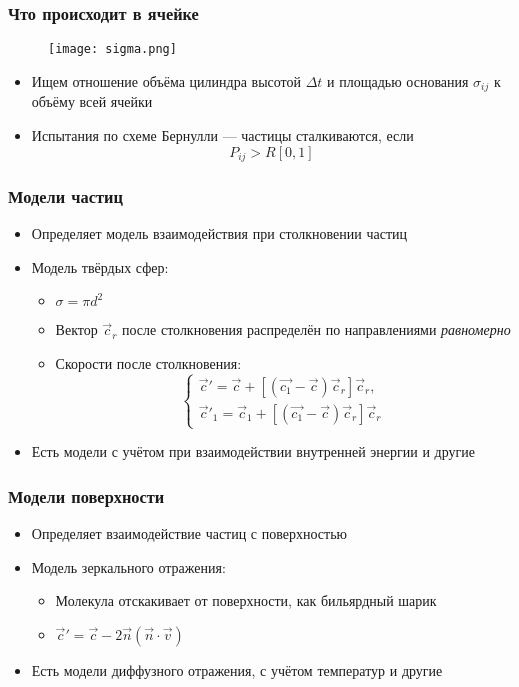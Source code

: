 \documentclass[onlymath]{beamer}
\begin{document}
\begin{frame}
  \frametitle{Что происходит в ячейке}
  \begin{figure}
    \centering
    \texttt{[image: sigma.png]}
  \end{figure}
  \begin{itemize}
  \item Ищем отношение объёма цилиндра высотой $\Delta t$ и площадью
    основания $\sigma_{ij}$ к объёму всей ячейки
  \item Испытания по схеме Бернулли — частицы сталкиваются, если
    \begin{equation*}
      P_{ij} > R[0,1]
    \end{equation*}
  \end{itemize}
\end{frame}

\begin{frame}
  \frametitle{Модели частиц}
  \begin{itemize}
  \item Определяет модель взаимодействия при столкновении частиц
  \item Модель твёрдых сфер: 
    \begin{itemize}
    \item $\sigma = \pi d^2$
    \item Вектор $\vec{c}_r$ после столкновения распределён по
      направлениями \emph{равномерно}
    \item Скорости после столкновения:
      \begin{equation*}
        \begin{cases}
          \vec{c}' = \vec{c} + [(\vec{c_1} - \vec{c})\vec{c}_r]\vec{c}_r,\\
          \vec{c}'_1 = \vec{c}_1 + [(\vec{c_1} - \vec{c})\vec{c}_r]\vec{c}_r
        \end{cases}
      \end{equation*}
    \end{itemize}
  \item Есть модели с учётом при взаимодействии внутренней энергии и
    другие
  \end{itemize}
\end{frame}

\begin{frame}
  \frametitle{Модели поверхности}
  \begin{itemize}
  \item Определяет взаимодействие частиц с поверхностью
  \item Модель зеркального отражения:
    \begin{itemize}
    \item Молекула отскакивает от поверхности, как бильярдный шарик
    \item $\vec{c}' = \vec{c} - 2\vec{n}(\vec{n} \cdot\vec{v})$
    \end{itemize}
  \item Есть модели диффузного отражения, с учётом температур и другие
  \end{itemize}
\end{frame}
\end{document}
